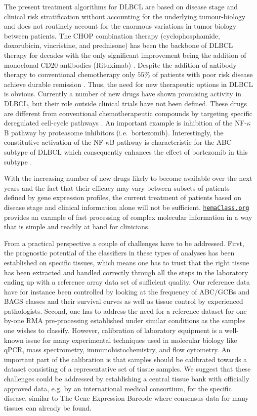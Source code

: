 \documentclass[10pt,letterpaper]{article}
\newcommand{\hemaClass}{\href{http://hemaClass.org}{\texttt{hemaClass.org}}}
\begin{document}
The present treatment algorithms for DLBCL are based on disease stage and clinical risk stratification without accounting for the underlying tumour-biology \cite{Schmoll2012} and does not routinely account for the enormous variations in tumor biology between patients.
The CHOP combination therapy (cyclophosphamide, doxorubicin, vincristine, and prednisone) has been the backbone of DLBCL therapy for decades with the only significant improvement being the addition of monoclonal CD20 antibodies (Rituximab) \cite{Coiffier2002a}.
Despite the addition of antibody therapy to conventional chemotherapy only $55\%$ of patients with poor risk disease achieve durable remission \cite{Ziepert2010}.
Thus, the need for new therapeutic options in DLBCL is obvious.
Currently a number of new drugs have shown promising activity in DLBCL, but their role outside clinical trials have not been defined.
These drugs are different from conventional chemotherapeutic compounds by targeting specific deregulated cell-cycle pathways \cite{Friedberg2011}.
An important example is inhibition of the NF-$\kappa$B pathway by proteasome inhibitors (i.e.\ bortezomib).
Interestingly, the constitutive activation of the NF-$\kappa$B pathway is characteristic for the ABC subtype of DLBCL which consequently enhances the effect of bortezomib in this subtype \cite{Dunleavy2009}.

With the increasing number of new drugs likely to become available over the next years and the fact that their efficacy may vary between subsets of patients defined by gene expression profiles, the current treatment of patients based on disease stage and clinical information alone will not be sufficient.
\hemaClass{} provides an example of fast processing of complex molecular information in a way that is simple and readily at hand for clinicians.

From a practical perspective a couple of challenges have to be addressed. First, the prognostic potential of the classifiers in these types of analyses has been established on specific tissues, which means one has to trust that the right tissue has been extracted and handled correctly through all the steps in the laboratory ending up with a reference array data set of sufficient quality. Our reference data have for instance been controlled by looking at the frequency of ABC/GCBs and BAGS classes and their survival curves as well as tissue control by experienced pathologists. Second, one has to address the need for a reference dataset for one-by-one RMA pre-processing established under similar conditions as the samples one wishes to classify. However, calibration of laboratory equipment is a well-known issue for many experimental techniques used in molecular biology like qPCR, mass spectrometry, immunohistochemistry, and flow cytometry. An important part of the calibration is that samples should be calibrated towards a dataset consisting of a representative set of tissue samples. We suggest that these challenges could be addressed by establishing a central tissue bank with officially approved data, e.g. by an international medical consortium, for the specific disease, similar to The Gene Expression Barcode \mbox{\cite{McCall2014}} where consensus data for many tissues can already be found.
\end{document}
